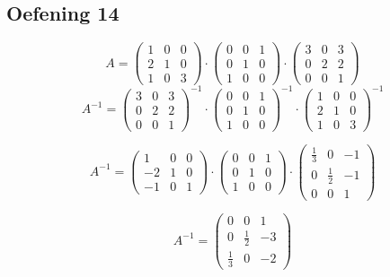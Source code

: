 \documentclass[lineaire_algebra_oplossingen.tex]{subfiles}
\begin{document}
\subsection{Oefening 14}
$$
A = 
\begin{pmatrix}
1 & 0 & 0\\
2 & 1 & 0\\
1 & 0 & 3
\end{pmatrix}
\cdot
\begin{pmatrix}
0 & 0 & 1\\
0 & 1 & 0\\
1 & 0 & 0
\end{pmatrix}
\cdot
\begin{pmatrix}
3 & 0 & 3\\
0 & 2 & 2\\
0 & 0 & 1  
\end{pmatrix}
$$
$$
A^{-1} = 
\begin{pmatrix}
3 & 0 & 3\\
0 & 2 & 2\\
0 & 0 & 1  
\end{pmatrix}^{-1}
\cdot
\begin{pmatrix}
0 & 0 & 1\\
0 & 1 & 0\\
1 & 0 & 0
\end{pmatrix}^{-1}
\cdot
\begin{pmatrix}
1 & 0 & 0\\
2 & 1 & 0\\
1 & 0 & 3
\end{pmatrix}^{-1}
$$

$$
A^{-1}=
\begin{pmatrix}
1 & 0 & 0\\
-2 & 1 & 0\\
-1 & 0 & 1
\end{pmatrix}
\cdot
\begin{pmatrix}
0 & 0 & 1\\
0 & 1 & 0\\
1 & 0 & 0
\end{pmatrix}
\cdot
\begin{pmatrix}
\frac{1}{3} & 0 & -1\\
0 & \frac{1}{2} & -1\\
0 & 0 & 1
\end{pmatrix}
$$

$$
A^{-1}=
\begin{pmatrix}
0 & 0 & 1\\
0 & \frac{1}{2} & -3\\
\frac{1}{3} & 0 & -2
\end{pmatrix}
$$
\end{document}
